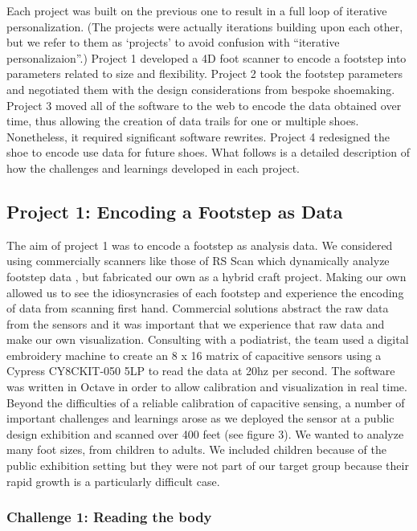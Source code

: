 Each project was built on the previous one to result in a full loop of iterative personalization. (The projects were actually iterations building upon each other, but we refer to them as `projects' to avoid confusion with ``iterative personalizaion''.)  Project 1 developed a 4D foot scanner to encode a footstep into parameters related to size and flexibility. Project 2 took the footstep parameters and negotiated them with the design considerations from bespoke shoemaking. Project 3 moved all of the software to the web to encode the data obtained over time, thus allowing the creation of data trails for one or multiple shoes. Nonetheless, it required significant software rewrites. Project 4 redesigned the shoe to encode use data for future shoes. What follows is a detailed description of how the challenges and learnings developed in each project.

\subsection{Project 1: Encoding a Footstep as Data}

The aim of project 1 was to encode a footstep as analysis data. We considered using commercially scanners like those of RS Scan which dynamically analyze footstep data \cite{Franklyn-Miller2014}, but fabricated our own as a hybrid craft project. Making our own allowed us to see the idiosyncrasies of each footstep and experience the encoding of data from scanning first hand. Commercial solutions abstract the raw data from the sensors and it was important that we experience that raw data and make our own visualization.  
Consulting with a podiatrist, the team used a digital embroidery machine to create an 8 x 16 matrix of capacitive sensors using a Cypress CY8CKIT-050 5LP to read the data at 20hz per second. The software was written in Octave in order to allow calibration and visualization in real time. Beyond the difficulties of a reliable calibration of capacitive sensing, a number of important challenges and learnings arose as we deployed the sensor at a public design exhibition and scanned over 400 feet (see figure 3). We wanted to analyze many foot sizes, from children to adults. We included children because of the public exhibition setting but they were not part of our target group because their rapid growth is a particularly difficult case.


\subsubsection{Challenge 1: Reading the body}

